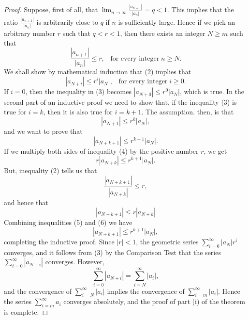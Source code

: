 \begin{proof}
Suppose, first of all, that $\lim_{n \rightarrow \infty} \frac{|a_{n+1}|}{|a_n|} = q < 1$. This implies that the ratio $\frac{|a_{n+1}|}{|a_n|}$ is arbitrarily close to $q$ if $n$ is sufficiently large. Hence if we pick an arbitrary number $r$ such that $q < r < 1$, then there exists an integer $N \geq m$ such that
\begin{equation}
\frac{|a_{n+1}|}{|a_n|} \leq r, \;\;\;\mbox{for every integer}\; n \geq N. 
\label{eq9.5.2}
\end{equation}
We shall show by mathematical induction that (2) implies that
\begin{equation}
|a_{N+i}| \leq r^{i}|a_N|, \;\;\;\mbox{for every integer}\; i \geq 0. \label{eq9.5.3}
\end{equation}
If $i = 0$, then the inequality in (3) becomes $|a_{N+0}| \leq r^{0}|a_N|$, which is true. In the second part of an inductive proof we need to show that, if the inequality
(3) is true for $i = k$, then it is also true for $i = k + 1$. The assumption. then, is that
\begin{equation}
|a_{N+1}| \leq r^k |a_N|, 
\label{eq9.5.4}
\end{equation}
and we want to prove that
$$
|a_{N+k+1}| \leq r^{k+1} |a_N| .
$$
If we multiply both sides of inequality (4) by the positive number $r$, we get
\begin{equation}
r |a_{N+k}| \leq r^{k+1} |a_N| .
\label{eq9.5.5}
\end{equation}
But, inequality (2) tells us that  
$$
\frac{|a_{N+k+1}|}{|a_{N+k}|} \leq r,
$$
and hence that
\begin{equation}
|a_{N+k+1}| \leq r|a_{N+k}|
\label{eq9.5.6}
\end{equation}
Combining inequalities (5) and (6) we have
$$
|a_{N+k+1}| \leq r^{k+1} |a_{N}|,
$$
completing the inductive proof. Since $|r|< 1$, the geometric series $\sum_{i=0}^\infty |a_N| r^i$ converges, and it follows from (3) by the Comparison Test that the series $\sum_{i=0}^\infty |a_{N+i}|$ converges. However,
$$
\sum_{i=0}^\infty |a_{N+i}| = \sum_{i=N}^\infty |a_i| ,
$$
and the convergence of $\sum_{i=N}^{\infty} |a_i|$ implies the convergence of $\sum_{i=m}^\infty |a_i|$. Hence the series $\sum_{i=m}^\infty a_i$ converges absolutely, and the proof of part (i) of the theorem is complete.


\end{proof}
